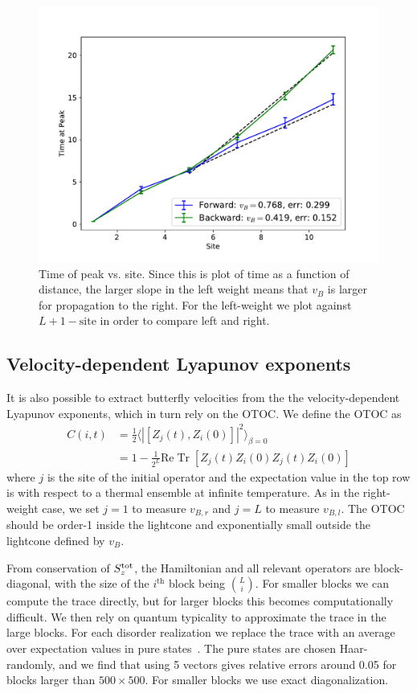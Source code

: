 \documentclass[aps,prx,reprint,superscriptaddress, longbibliography]{revtex4-1}
\newcommand{\charlie}[1]{{\color{Magenta}{{#1}}}}
\newcommand{\Tr}{ \mbox{Tr}}
\renewcommand{\Re}{ \mbox{Re}}
\newcommand{\Sz}{S_z^{\rm tot}}
\newcommand{\half}{\frac{1}{2}}
\begin{document}
\begin{figure}
	\includegraphics[width=\columnwidth]{Rweightpeaktimes}
	\caption{Time of peak vs. site. Since this is plot of time as a function of distance, the larger slope in the left weight means that $v_B$ is larger for propagation to the right. For the left-weight we plot against $L+1-\text{site}$ in order to compare left and right.}
	\label{fig:Rweightpeaktimes}
\end{figure}

\subsection{Velocity-dependent Lyapunov exponents}

It is also possible to extract butterfly velocities from the the velocity-dependent Lyapunov exponents, which in turn rely on the OTOC. We define the OTOC as 
\begin{align}
C(i,t) & = \half \langle|[Z_j(t),Z_i(0)]|^2\rangle_{\beta=0}\nonumber\\
&= 1 - \frac{1}{2^{L}}\Re\;\Tr\;[Z_j(t)Z_i(0)Z_j(t)Z_i(0)]
\end{align}
where $j$ is the site of the initial operator and the expectation value in the top row is with respect to a thermal ensemble at infinite temperature. As in the right-weight case, we set $j=1$ to measure $v_{B,r}$ and $j=L$ to measure $v_{B,l}$. The OTOC should be order-1 inside the lightcone and exponentially small outside the lightcone defined by $v_B$.

\charlie{Move this paragraph to an appendix?}
From conservation of $\Sz$, the Hamiltonian and all relevant operators are block-diagonal, with the size of the $i^\text{th}$ block being $\binom{L}{i}$. For smaller blocks we can compute the trace directly, but for larger blocks this becomes computationally difficult. We then rely on quantum typicality to approximate the trace in the large blocks. For each disorder realization we replace the trace with an average over expectation values in pure states~\cite{Luitz2017}. The pure states are chosen Haar-randomly, and we find that using 5 vectors gives relative errors around 0.05 for blocks larger than $500\times 500$. For smaller blocks we use exact diagonalization.
\end{document}

